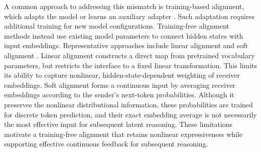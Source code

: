 \documentclass[11pt]{article}
\begin{document}
A common approach to addressing this mismatch is training-based alignment, which adapts the model or learns an auxiliary adapter \citep{coconut,c2c,interlat,latent_cache_flow,cache_alignment}. Such adaptation requires additional training for new model configurations. Training-free alignment methods instead use existing model parameters to connect hidden states with input embeddings. Representative approaches include linear alignment \citep{latentmas} and soft alignment \citep{soft_thinking}. Linear alignment constructs a direct map from pretrained vocabulary parameters, but restricts the interface to a fixed linear transformation. This limits its ability to capture nonlinear, hidden-state-dependent weighting of receiver embeddings. Soft alignment forms a continuous input by averaging receiver embeddings according to the sender's next-token probabilities. Although it preserves the nonlinear distributional information, these probabilities are trained for discrete token prediction, and their exact embedding average is not necessarily the most effective input for subsequent latent reasoning. These limitations motivate a training-free alignment that retains nonlinear expressiveness while supporting effective continuous feedback for subsequent reasoning.




\end{document}

